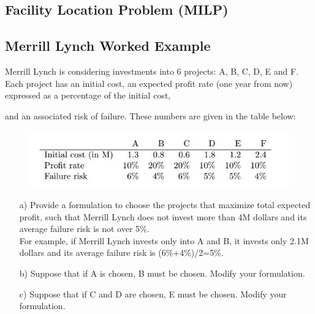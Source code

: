 \documentclass{beamer}
\begin{document}
\subsection{ Facility Location Problem (MILP) }
\begin{frame}
\end{frame}
\subsection{ Merrill Lynch Worked Example}
\begin{frame}
	Merrill Lynch is considering investments into 6 projects: A, B, C, D, E and F. Each project has an
	initial cost, an expected profit rate (one year from now) expressed as a percentage of the initial cost,

	and an associated risk of failure. These numbers are given in the table below:
\begin{figure}
\centering
\includegraphics[width=0.7\linewidth]{MErrillLynchExample}
\caption{}
\label{fig:MErrillLynchExample}
\end{figure}

\end{frame}

\begin{frame}
\begin{itemize}
\item[a)]Provide a formulation to choose the projects that maximize total expected profit, such that Merrill
Lynch does not invest more than 4M dollars and its average failure risk is not over 5\%. \\ For example,
if Merrill Lynch invests only into A and B, it invests only 2.1M dollars and its average failure risk is
(6\%+4\%)/2=5\%.
\item[b)] Suppose that if A is chosen, B must be chosen. Modify your formulation.
\item[c)] Suppose that if C and D are chosen, E must be chosen. Modify your formulation.
\end{itemize} 
\end{frame}
\end{document}
